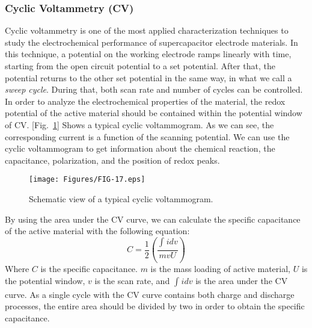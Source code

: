 \documentclass[reprint,amsmath,amssymb,aps,floatfix,
]{revtex4-2}
\begin{document}
\subsubsection{Cyclic Voltammetry (CV)}
Cyclic voltammetry is one of the most applied characterization techniques to study the electrochemical performance of supercapacitor electrode materials. In this technique, a potential on the working electrode ramps linearly with time, starting from the open circuit potential to a set potential. After that, the potential returns to the other set potential in the same way, in what we call a {\it sweep cycle}. During that, both scan rate and number of cycles can be controlled. In order to analyze the electrochemical properties of the material, the redox potential of the active material should be contained within the potential window of CV. [Fig.~\ref{fig:fig17}] Shows a typical cyclic voltammogram. As we can see, the corresponding current is a function of the scanning potential. We can use the cyclic voltammogram to get information about the chemical reaction, the capacitance, polarization, and the position of redox peaks.
\begin{figure}[b]
    \centering
    \texttt{[image: Figures/FIG-17.eps]}
    \caption{\label{fig:fig17}Schematic view of a typical cyclic voltammogram.}
    \end{figure}
By using the area under the CV curve, we can calculate the specific capacitance of the active material with the following equation:
\begin{equation}
    C = \frac{1}{2}(\frac{\int_{}^{}idv}{mvU})      
\end{equation}
Where $C$ is the specific capacitance. $m$ is the mass loading of active material, $U$ is the potential window, $v$ is the scan rate, and $\int_{}^{}idv$ is the area under the CV curve. As a single cycle with the CV curve contains both charge and discharge processes, the entire area should be divided by two in order to obtain the specific capacitance.
\end{document}
